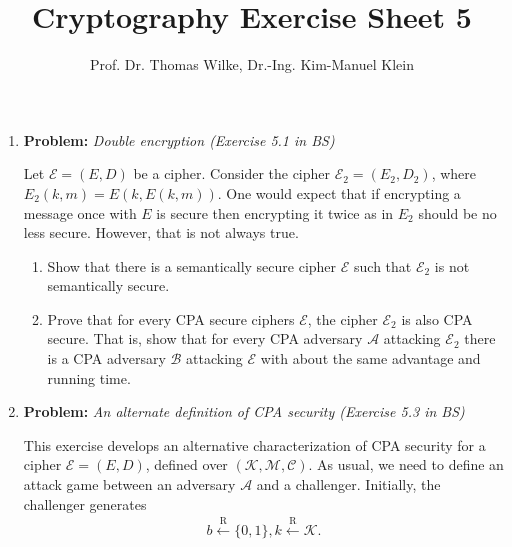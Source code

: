 \documentclass[11pt]{article}
\begin{document}
	
	\title{\textbf{Cryptography Exercise Sheet 5}}
	\author{Prof. Dr. Thomas Wilke, Dr.-Ing. Kim-Manuel Klein}
	\maketitle
	\medskip
	
	\begin{enumerate}
		
		\item
		\textbf{Problem:} \textit{Double encryption (Exercise 5.1 in BS)}
		
		Let $\mathcal{E} = (E,D)$ be a cipher. Consider the cipher $\mathcal{E}_2=(E_2, D_2)$, where $E_2(k,m) = E(k, E(k,m))$. One would expect that if encrypting a message once with $E$ is secure then encrypting it twice as in $E_2$ should be no less secure. However, that is not always true.
		\begin{enumerate}
		
 		\item Show that there is a semantically secure cipher $ \mathcal{E}$ such that $\mathcal{E}_2$ is not semantically secure.
		\item Prove that for every CPA secure ciphers $\mathcal{E}$, the cipher $\mathcal{E}_2$ is also CPA secure. That is, show
		that for every CPA adversary $ \mathcal{A}$ attacking $\mathcal{E}_2$ there is a CPA adversary $ \mathcal{B}$ attacking $ \mathcal{E}$ with
		about the same advantage and running time.
		
     	\end{enumerate}
	
		\item
        \textbf{Problem:} \textit{An alternate definition of CPA security (Exercise 5.3 in BS)}
        
        This exercise develops an alternative characterization of CPA security for a cipher $\mathcal{E} = (E,D)$, defined over  $(\mathcal{K}, \mathcal{M}, \mathcal{C})$. As usual, we need to
        define an attack game between an adversary $\mathcal{A}$ and a challenger. Initially, the challenger generates
      	\begin{align}
      	b \xleftarrow{\text{R}} \{0,1\}, k \xleftarrow{\text{R}} \mathcal{K}. 
      	\end{align}
      

\end{enumerate}
\end{document}
